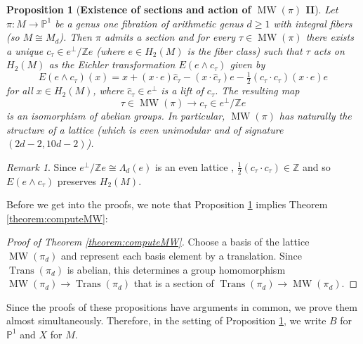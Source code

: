 \documentclass[10pt,letterpaper]{amsart}
\numberwithin{equation}{section}
\def\PP{{\mathbb P}}
\def\ZZ{{\mathbb Z}}
\newcommand\MW{\operatorname{MW}}
\newcommand\Trans{\operatorname{Trans}}
\newtheorem{proposition}[theorem]{Proposition}
\theoremstyle{remark}
\newtheorem{remark}[theorem]{Remark}
\begin{document}
\begin{proposition}[{\bf Existence of sections and action of $\MW(\pi)$ II}]
\label{prop:MWcohomologyII}
Let  $\pi :M\to \PP^1$ be a genus one fibration of arithmetic  genus $d\ge 1$ with integral fibers (so $M\cong M_d$).
Then $\pi$ admits a section and for every  $\tau\in \MW(\pi)$ there exists a unique $c_\tau\in e^\perp/\ZZ e$
(where  $e\in H_2(M)$ is the fiber class)
 such that $\tau$ acts on $H_2(M)$ as the Eichler transformation $E(e \wedge c_\tau)$ given by 
\[
E(e\wedge c_\tau)(x)=x+ (x \cdot e )\hat c_\tau - (x\cdot \hat c_\tau)e -\tfrac{1}{2}(c_\tau\cdot c_\tau)(x\cdot e)e \]
for all $x\in H_2(M)$, 
where $\hat c_\tau\in e ^\perp$ is a lift of $c_\tau$. 
The resulting map 
\[
\tau\in\MW(\pi)\to  c_\tau\in e^\perp/\ZZ e
\]
 is an isomorphism of abelian groups. In particular, $\MW(\pi)$ has  naturally the structure of a lattice (which is even unimodular and of 
 signature $(2d-2, 10d-2)$). 

\end{proposition}

\begin{remark}\label{rem:}
Since  $e^\perp/\ZZ e\cong \Lambda_d(e)$ is an even lattice ,   $\tfrac{1}{2}(c_\tau\cdot c_\tau)\in \ZZ$ and so $E(e\wedge c_\tau)$ preserves $H_2(M)$. 
\end{remark}

Before we get into the proofs, we note that Proposition \ref{prop:MWcohomologyII} implies Theorem \ref{theorem:computeMW}:


\begin{proof}[Proof of Theorem \ref{theorem:computeMW}]
Choose a basis of the lattice $\MW(\pi_d)$ and represent  each basis element by a translation. Since $\Trans(\pi_d)$ is abelian, this 
determines a group homomorphism $\MW(\pi_d)\to\Trans(\pi_d)$ that is a section of  $\Trans(\pi_d)\to \MW(\pi_d)$.
\end{proof}


Since the proofs of these propositions have arguments in common, we prove them almost simultaneously. Therefore, 
in the setting of Proposition \ref{prop:MWcohomologyII}, we write $B$  for $\PP^1$ and $X$ for $M$.
\end{document}
